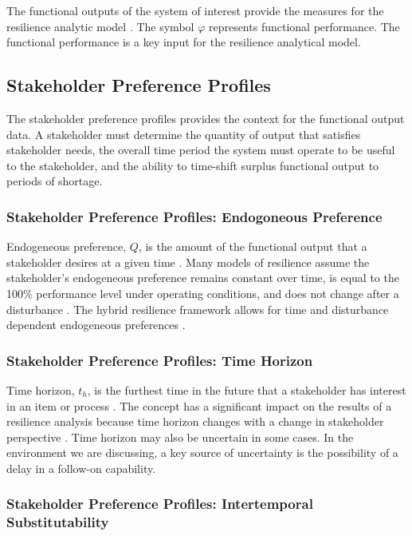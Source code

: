 \documentclass[preprint,12pt]{elsarticle}
\begin{document}
The functional outputs of the system of interest provide the
measures for the resilience analytic model \cite{Ayyub2014a}. The
symbol $\varphi$ represents functional performance. The functional
performance is a key input for the resilience analytical model.

\subsection{Stakeholder Preference Profiles}
The stakeholder preference profiles provides the context for the
functional output data. A stakeholder must determine the quantity of
output that satisfies stakeholder needs, the overall time period the
system must operate to be useful to the stakeholder, and the ability
to time-shift surplus functional output to periods of shortage.

\subsubsection{Stakeholder Preference Profiles: Endogoneous Preference}

Endogeneous preference, $Q$, is the amount of the functional output
that a stakeholder desires at a given time \cite{Black2013}.  Many
models of resilience assume the stakeholder's endogeneous preference
remains constant over time, is equal to the 100\% 
performance level under operating conditions, and does not change
after a disturbance \cite{Emanuel2017}. The hybrid resilience
framework allows for time and disturbance dependent endogeneous
preferences \cite{Emanuel2018}.

\subsubsection{Stakeholder Preference Profiles: Time Horizon}
Time horizon, $t_h$, is the furthest time in the future that a stakeholder 
has interest in an item or process \cite{Black2013}. The concept has a
significant impact on the results 
of a resilience analysis because time 
horizon changes with a change in stakeholder perspective
\cite{Emanuel2018}. Time horizon may also be uncertain in
% 
% 
some cases. In the environment we are discussing, a key source of
uncertainty is the possibility of a delay in a follow-on capability.

\subsubsection{Stakeholder Preference Profiles: Intertemporal
  Substitutability}
\end{document}
